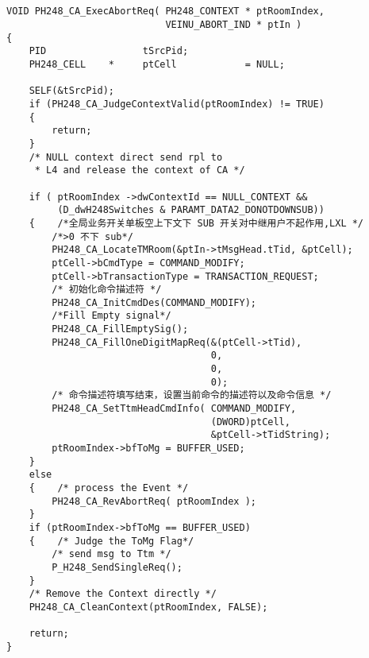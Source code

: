 ﻿\documentclass  [11pt,onecolumn]{article}
\begin{document}
\subsection{}
\begin{lstlisting}
VOID PH248_CA_ExecAbortReq( PH248_CONTEXT * ptRoomIndex,
                            VEINU_ABORT_IND * ptIn )
{
    PID                 tSrcPid;
    PH248_CELL    *     ptCell            = NULL;

    SELF(&tSrcPid);
    if (PH248_CA_JudgeContextValid(ptRoomIndex) != TRUE)
    {
        return;
    }
    /* NULL context direct send rpl to 
     * L4 and release the context of CA */

    if ( ptRoomIndex ->dwContextId == NULL_CONTEXT && 
         (D_dwH248Switches & PARAMT_DATA2_DONOTDOWNSUB))  
    {    /*全局业务开关单板空上下文下 SUB 开关对中继用户不起作用,LXL */
        /*>0 不下 sub*/
        PH248_CA_LocateTMRoom(&ptIn->tMsgHead.tTid, &ptCell);
        ptCell->bCmdType = COMMAND_MODIFY;
        ptCell->bTransactionType = TRANSACTION_REQUEST;
        /* 初始化命令描述符 */
        PH248_CA_InitCmdDes(COMMAND_MODIFY);
        /*Fill Empty signal*/
        PH248_CA_FillEmptySig();
        PH248_CA_FillOneDigitMapReq(&(ptCell->tTid),
                                    0,
                                    0,
                                    0); 
        /* 命令描述符填写结束，设置当前命令的描述符以及命令信息 */
        PH248_CA_SetTtmHeadCmdInfo( COMMAND_MODIFY,
                                    (DWORD)ptCell,
                                    &ptCell->tTidString);
        ptRoomIndex->bfToMg = BUFFER_USED;    
    }
    else
    {    /* process the Event */
        PH248_CA_RevAbortReq( ptRoomIndex );
    }
    if (ptRoomIndex->bfToMg == BUFFER_USED) 
    {    /* Judge the ToMg Flag*/
        /* send msg to Ttm */
        P_H248_SendSingleReq();   
    }
    /* Remove the Context directly */
    PH248_CA_CleanContext(ptRoomIndex, FALSE);

    return;
}
\end{lstlisting}


\subsection{}
\end{document}
